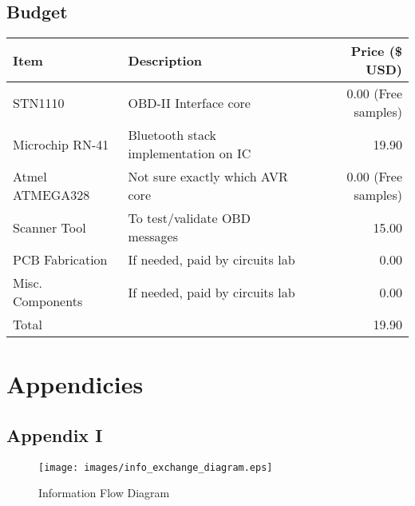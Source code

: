 \documentclass[12pt,letterpaper]{article}
\begin{document}
\subsection{Budget}
\begin{tabular}{| l | p{7cm} | r |}
\hline
Item & Description & Price (\$ USD) \\ \hline
STN1110 & OBD-II Interface core & 0.00 (Free samples) \\ \hline
Microchip RN-41 & Bluetooth stack implementation on IC & 19.90 \\ \hline
Atmel ATMEGA328 & Not sure exactly which AVR core & 0.00 (Free samples) \\ \hline
Scanner Tool & To test/validate OBD messages & 15.00 \\ \hline
PCB Fabrication & If needed, paid by circuits lab & 0.00 \\ \hline
Misc. Components & If needed, paid by circuits lab & 0.00 \\ \hline
\hline
Total && 19.90 \\ \hline
\end{tabular}

\newpage

\section{Appendicies}
\subsection{Appendix I}
\begin{figure}[!ht]
\centering
\texttt{[image: images/info\_exchange\_diagram.eps]}
\caption{Information Flow Diagram}
\label{fig: image}
\end{figure}
\end{document}
